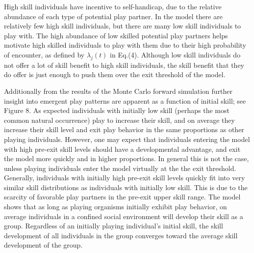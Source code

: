 \documentclass[12pt, letterpaper, fleqn]{article}
\begin{document}
      High skill individuals have incentive to self-handicap, due to the relative abundance of each type of potential play partner.
      In the model there are relatively few high skill individuals, but there are many low skill individuals to play with.
      The high abundance of low skilled potential play partners helps motivate high skilled individuals to play with them due to their high probability of encounter, as defined by $\lambda_j(t)$ in Eq.(4).  
      Although low skill individuals do not offer a lot of skill benefit to high skill individuals, the skill benefit that they do offer is just enough to push them over the exit threshold of the model.
   
      Additionally from the results of the Monte Carlo forward simulation further insight into emergent play patterns are apparent as a function of initial skill; see Figure 8. %
      As expected individuals with initially low skill (perhaps the most common natural occurrence) play to increase their skill, and on average they increase their skill level and exit play behavior in the same proportions as other playing individuals.      
      However, one may expect that individuals entering the model with high pre-exit skill levels should have a developmental advantage, and exit the model more quickly and in higher proportions. 
      In general this is not the case, unless playing individuals enter the model virtually at the the exit threshold.
      Generally, individuals with initially high pre-exit skill levels quickly fit into very similar skill distributions as individuals with initially low skill.
      This is due to the scarcity of favorable play partners in the pre-exit upper skill range. %
      The model shows that as long as playing organisms initially exhibit play behavior, on average individuals in a confined social environment will develop their skill as a group.
      Regardless of an initially playing individual's initial skill, the skill development of all individuals in the group converges toward the average skill development of the group. 
\end{document}

